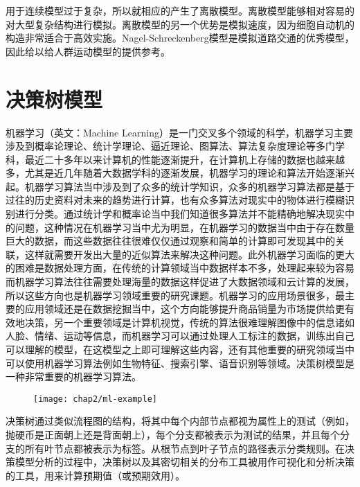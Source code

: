 用于连续模型过于复杂，所以就相应的产生了离散模型。离散模型能够相对容易的对大型复杂结构进行模拟。离散模型的另一个优势是模拟速度，因为细胞自动机的构造非常适合于高效实施。Nagel-Schreckenberg\cite{nagel1992cellular}模型是模拟道路交通的优秀模型，因此给以给人群运动模型的提供参考。 

\section{决策树模型}

机器学习（英文：Machine Learning）是一门交叉多个领域的科学，机器学习主要涉及到概率论理论、统计学理论、逼近理论、图算法、算法复杂度理论等多门学科，最近二十多年以来计算机的性能逐渐提升，在计算机上存储的数据也越来越多，尤其是近几年随着大数据学科的逐渐发展，机器学习的理论和算法开始逐渐兴起。机器学习算法当中涉及到了众多的统计学知识，众多的机器学习算法都是基于过往的历史资料对未来的趋势进行计算，也有众多算法对现实中的物体进行模糊识别进行分类。通过统计学和概率论当中我们知道很多算法并不能精确地解决现实中的问题，这种情况在机器学习当中尤为明显，在机器学习的数据当中由于存在数量巨大的数据，而这些数据往往很难仅仅通过观察和简单的计算即可发现其中的关联，这样就需要开发出大量的近似算法来解决这种问题。此外机器学习面临的更大的困难是数据处理方面，在传统的计算领域当中数据样本不多，处理起来较为容易而机器学习算法往往需要处理海量的数据这样促进了大数据领域和云计算的发展，所以这些方向也是机器学习领域重要的研究课题。机器学习的应用场景很多，最主要的应用领域还是在数据挖掘当中，这个方向能够提升商品销量为市场提供给更有效地决策，另一个重要领域是计算机视觉，传统的算法很难理解图像中的信息诸如人脸、情绪、运动等信息，而机器学习可以通过处理人工标注的数据，训练出自己可以理解的模型，在这模型之上即可理解这些内容，还有其他重要的研究领域当中可以使用机器学习算法例如生物特征、搜索引擎、语音识别等领域。决策树模型是一种非常重要的机器学习算法。

\begin{figure}[!htp]
    \centering
    \texttt{[image: chap2/ml-example]}
\end{figure}

决策树\cite{quinlan1986induction}通过类似流程图的结构，将其中每个内部节点都视为属性上的测试（例如，抛硬币是正面朝上还是背面朝上），每个分支都被表示为测试的结果，并且每个分支的所有叶节点都被表示为标签。从根节点到叶子节点的路径表示分类规则。在决策模型分析的过程中，决策树以及其密切相关的分布工具被用作可视化和分析决策的工具，用来计算预期值（或预期效用）。

